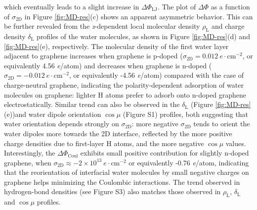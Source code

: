 \documentclass[journal=ancac3,manuscript=article,email=true,hyperref=true,keywords=true]{achemso}
\begin{document}
which eventually leads to a slight increase in \(\Delta
\Phi_{\mathrm{LJ}}\).  The plot of \(\Delta \Phi\) as a function of
\(\sigma_{\mathrm{2D}}\) in Figure \ref{fig:MD-res}(c) shows an apparent
asymmetric behavior. This can be further revealed from the
\emph{z}-dependent local molecular density \(\rho_{\mathrm{L}}\) and charge
density \(\delta_{\mathrm{L}}\) profiles of the water molecules, as
shown in Figure \ref{fig:MD-res}(d) and \ref{fig:MD-res}(e),
respectively. The molecular density of the first water layer adjacent
to graphene increases when graphene is p-doped
(\(\sigma_{\mathrm{2D}}=0.012\ e\cdot \mathrm{cm}^{-2}\), or
equivalently 4.56 \textit{e}/atom) and decreases when graphene is
n-doped (\(\sigma_{\mathrm{2D}}=-0.012\ e\cdot \mathrm{cm}^{-2}\), or
equivalently -4.56 \textit{e}/atom) compared with the case of
charge-neutral graphene, indicating the polarity-dependent adsorption
of water molecules on graphene: lighter H atoms prefer to adsorb onto
n-doped graphene electrostatically. Similar trend can also be observed
in the \(\delta_{\mathrm{L}}\) (Figure \ref{fig:MD-res}(e))and water
dipole orientation \(\cos \mu\) (Figure S1) profiles, both
suggesting that water orientation depends strongly on
\(\sigma_{\mathrm{2D}}\): more negative \(\sigma_{\mathrm{2D}}\) tends
to orient the water dipoles more towards the 2D interface, reflected
by the more positive charge densities due to first-layer H atoms, and
the more negative \(\cos \mu\) values. Interestingly, the \(\Delta
\Phi_{\mathrm{Coul}}\) exhibits small positive contribution for slightly
n-doped graphene, when \(\sigma_{\mathrm{2D}} \approx -2\times10^{13}\
e\cdot \mathrm{cm}^{-2}\) or equivalently -0.76 \textit{e}/atom,
indicating that the reorientation of interfacial water molecules by
small negative charges on graphene helps minimizing the Coulombic
interactions. The trend observed in hydrogen-bond densities (see
Figure S3) also matches those observed in \(\rho_{\mathrm{L}}\),
\(\delta_{\mathrm{L}}\) and \(\cos \mu\) profiles.
\end{document}

